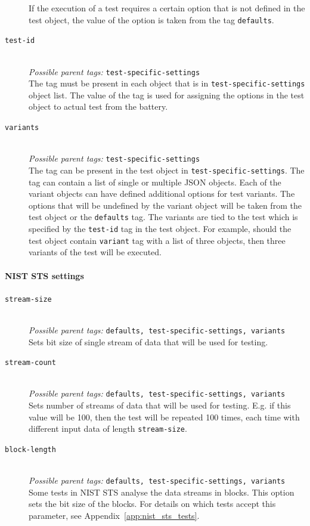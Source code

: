 \documentclass[
	digital,    %
	oneside,    %
	color,
	11pt,
	nocover,
	notable,
	nolof,
	nolot,
]{fithesis3}
\theoremstyle{definition}
\theoremstyle{remark}
\begin{document}
\begin{description}
If the execution of a test requires a certain option that is not defined in the test object, the value of the option is taken from the tag \texttt{defaults}.

\item[\texttt{test-id}] \hfill \\
\textit{Possible parent tags: } \texttt{test-specific-settings} \\
The tag must be present in each object that is in \texttt{test-specific-settings} object list. The value of the tag is used for assigning the options in the test object to actual test from the battery.

\item[\texttt{variants}] \hfill \\
\textit{Possible parent tags: } \texttt{test-specific-settings} \\
The tag can be present in the test object in \texttt{test-specific-settings}. The tag can contain a list of single or multiple JSON objects. Each of the variant objects can have defined additional options for test variants. The options that will be undefined by the variant object will be taken from the test object or the \texttt{defaults} tag. The variants are tied to the test which is specified by the \texttt{test-id} tag in the test object. For example, should the test object contain \texttt{variant} tag with a list of three objects, then three variants of the test will be executed.
\end{description}

\paragraph{NIST STS settings}

\begin{description}
\item[\texttt{stream-size}] \hfill \\
\textit{Possible parent tags: } \texttt{defaults, test-specific-settings, variants} \\
Sets bit size of single stream of data that will be used for testing.

\item[\texttt{stream-count}] \hfill \\
\textit{Possible parent tags: } \texttt{defaults, test-specific-settings, variants} \\
Sets number of streams of data that will be used for testing. E.g. if this value will be 100, then the test will be repeated 100 times, each time with different input data of length \texttt{stream-size}.

\item[\texttt{block-length}] \hfill \\
\textit{Possible parent tags: } \texttt{defaults, test-specific-settings, variants} \\
Some tests in NIST STS analyse the data streams in blocks. This option sets the bit size of the blocks. For details on which tests accept this parameter, see Appendix~\ref{app:nist_sts_tests}.

\end{description}
\end{document}
